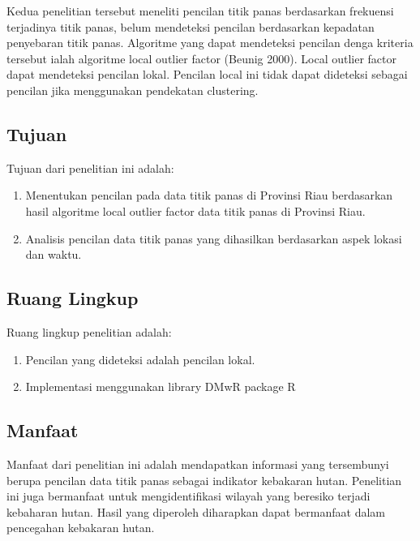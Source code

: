 Kedua penelitian tersebut meneliti pencilan titik panas berdasarkan frekuensi terjadinya titik panas, belum mendeteksi pencilan berdasarkan kepadatan penyebaran titik panas. Algoritme yang dapat mendeteksi pencilan denga kriteria tersebut ialah algoritme local outlier factor (Beunig 2000). Local outlier factor dapat mendeteksi pencilan lokal. Pencilan local ini tidak dapat dideteksi sebagai pencilan jika menggunakan pendekatan clustering.
\vfill\eject

\subsection*{Tujuan}
Tujuan dari penelitian ini adalah:
\begin{enumerate}[noitemsep] 
\item Menentukan pencilan pada data titik panas di      
Provinsi Riau berdasarkan hasil algoritme local outlier factor data titik panas di Provinsi Riau.
\item Analisis pencilan data titik panas yang dihasilkan berdasarkan aspek lokasi dan waktu. 
\end{enumerate}

\subsection*{Ruang Lingkup}
Ruang lingkup penelitian adalah:
\begin{enumerate}[noitemsep] 
\item Pencilan yang dideteksi adalah pencilan lokal.
\item Implementasi menggunakan library DMwR package R

\end{enumerate}

\subsection*{Manfaat}
Manfaat dari penelitian ini adalah mendapatkan informasi yang tersembunyi berupa pencilan data titik panas sebagai indikator kebakaran hutan. Penelitian ini juga bermanfaat untuk mengidentifikasi wilayah yang beresiko terjadi kebaharan hutan. Hasil yang diperoleh diharapkan dapat bermanfaat dalam pencegahan kebakaran hutan.


